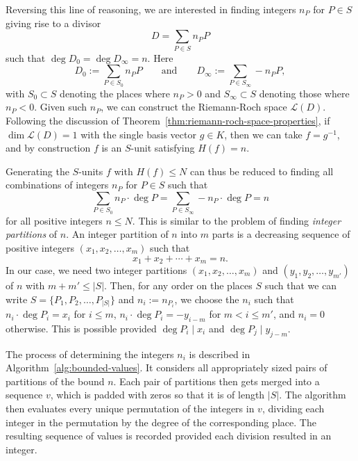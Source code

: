 Reversing this line of reasoning, we are interested in finding integers \(n_{P}\) for \(P \in S\) giving rise to a divisor
\[D = \sum_{P \in S} n_{P} P\]
such that \(\deg{D_{0}} = \deg{D_{\infty}} = n\). Here
\[D_{0} := \sum_{P \in S_{0}} n_{P} P \qquad \text{and} \qquad D_{\infty} := \sum_{P \in S_{\infty}} - n_{P} P,\]
with \(S_{0} \subset S\) denoting the places where \(n_{P} > 0\) and \(S_{\infty} \subset S\) denoting those where \(n_{P} < 0\). Given such \(n_{P}\), we can construct the Riemann-Roch space \(\mathcal{L}(D)\). Following the discussion of Theorem~\ref{thm:riemann-roch-space-properties}, if \(\dim{\mathcal{L}(D)} = 1\) with the single basis vector \(g \in K\), then we can take \(f = g^{-1}\), and by construction \(f\) is an \(S\)-unit satisfying \(H(f) = n\).

Generating the \(S\)-units \(f\) with \(H(f) \leq N\) can thus be reduced to finding all combinations of integers \(n_{P}\) for \(P \in S\) such that
\[\sum_{P \in S_{0}} n_{P} \cdot \deg{P} = \sum_{P \in S_{\infty}} - n_{P} \cdot \deg{P} = n\]
for all positive integers \(n \leq N\). This is similar to the problem of finding \textit{integer partitions} of \(n\). An integer partition of \(n\) into \(m\) parts is a decreasing sequence of positive integers \((x_{1}, x_{2}, \dots, x_{m})\) such that
\[x_{1} + x_{2} + \cdots + x_{m} = n.\]
In our case, we need two integer partitions \((x_{1}, x_{2}, \dots, x_{m})\) and \((y_{1}, y_{2}, \dots, y_{m'})\) of \(n\) with \({m + m' \leq |S|}\). Then, for any order on the places \(S\) such that we can write \(S = \{P_{1}, P_{2}, \dots, P_{|S|}\}\) and \(n_{i} := n_{P_{i}}\), we choose the \(n_{i}\) such that \(n_{i} \cdot \deg{P_{i}} = x_{i}\) for \(i \leq m\), \(n_{i} \cdot \deg{P_{i}} = -y_{i - m}\) for \(m < i \leq m'\), and \(n_{i} = 0\) otherwise. This is possible provided \(\deg{P_{i}} \mid x_{i}\) and \(\deg{P_{j}} \mid y_{j - m}\).

The process of determining the integers \(n_{i}\) is described in Algorithm~\ref{alg:bounded-values}. It considers all appropriately sized pairs of partitions of the bound \(n\). Each pair of partitions then gets merged into a sequence \(v\), which is padded with zeros so that it is of length \(|S|\). The algorithm then evaluates every unique permutation of the integers in \(v\), dividing each integer in the permutation by the degree of the corresponding place. The resulting sequence of values is recorded provided each division resulted in an integer.

